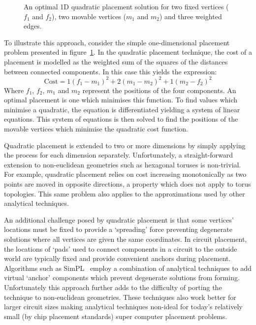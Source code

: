 				\begin{figure}
					\center
					
					\caption[An optimal 1D quadratic placement solution.]%
					{An optimal 1D quadratic placement solution for two fixed
					vertices ($f_1$ and $f_2$), two movable vertices ($m_1$ and $m_2$)
					and three weighted edges.}
					\label{fig:quadratic-placement}
				\end{figure}
				
				To illustrate this approach, consider the simple one-dimensional
				placement problem presented in figure~\ref{fig:quadratic-placement}.
				In the quadratic placement technique, the cost of a placement is
				modelled as the weighted sum of the squares of the distances between
				connected components. In this case this yields the expression:
				\begin{equation*}
					\textrm{Cost} = 1(f_1 - m_1)^2 + 2(m_1 - m_2)^2 + 1(m_2 - f_2)^2
				\end{equation*}
				Where $f_1$, $f_2$, $m_1$ and $m_2$ represent the positions of the four
				components. An optimal placement is one which minimises this function.
				To find values which minimise a quadratic, the equation is
				differentiated yielding a system of linear equations. This system of
				equations is then solved to find the positions of the movable vertices
				which minimise the quadratic cost function.
				
				Quadratic placement is extended to two or more dimensions by simply
				applying the process for each dimension separately. Unfortunately, a
				straight-forward extension to non-euclidean geometries such as
				hexagonal toruses is non-trivial. For example, quadratic placement
				relies on cost increasing monotonically as two points are moved in
				opposite directions, a property which does not apply to torus
				topologies. This same problem also applies to the approximations used
				by other analytical techniques.
				
				An additional challenge posed by quadratic placement is that some
				vertices' locations must be fixed to provide a `spreading'
				force preventing degenerate solutions where all vertices are given the
				same coordinates. In circuit placement, the locations of `pads' used to
				connect components in a circuit to the outside world are typically
				fixed and provide convenient anchors during placement. Algorithms such
				as SimPL~\cite{kim12b} employ a combination of analytical techniques
				to add virtual `anchor' components which prevent degenerate
				solutions from forming. Unfortunately this approach further adds to the
				difficulty of porting the technique to non-euclidean geometries. These
				techniques also work better for larger circuit sizes making analytical
				techniques non-ideal for today's relatively small (by chip placement
				standards) super computer placement problems.
				

